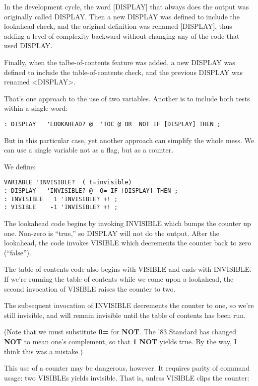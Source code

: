 In the development cycle, the word [DISPLAY] that always does
the output was originally called DISPLAY. Then a new DISPLAY was
defined to include the lookahead check, and the original definition was
renamed [DISPLAY], thus adding a level of complexity backward
without changing any of the code that used DISPLAY.

Finally, when the talbe-of-contents feature was added, a new DISPLAY
was defined to include the table-of-contents check, and the
previous DISPLAY was renamed <DISPLAY>.

That's one approach to the use of two variables. Another is to include
both tests within a single word:

\begin{verbatim}
: DISPLAY   'LOOKAHEAD? @  'TOC @ OR  NOT IF [DISPLAY] THEN ;
\end{verbatim}

But in this particular case, yet another approach can simplify the whole
mess. We can use a single variable not as a flag, but as a counter.

We define:

\begin{verbatim}
VARIABLE 'INVISIBLE?  ( t=invisible)
: DISPLAY   'INVISIBLE? @  O= IF [DISPLAY] THEN ;
: INVISIBLE   1 'INVISIBLE? +! ;
: VISIBLE    -1 'INVISIBLE? +! ;
\end{verbatim}

The lookahead code begins by invoking INVISIBLE which bumps the
counter up one. Non-zero is ``true,'' so DISPLAY will not do the output.
After the lookahead, the code invokes VISIBLE which decrements the
counter back to zero (``false'').

The table-of-contents code also begins with VISIBLE and ends with
INVISIBLE. If we're running the table of contents while we come upon a
lookahead, the second invocation of VISIBLE raises the counter to two.

The subsequent invocation of INVISIBLE decrements the counter to
one, so we're still invisible, and will remain invisible until the table of
contents has been run.

(Note that we must substitute \textbf{0=} for \textbf{NOT}. The '83 Standard has
changed \textbf{NOT} to mean one's complement, so that \textbf{1 NOT} yields true. By
the way, I think this was a mistake.)

This use of a counter may be dangerous, however. It requires parity
of command usage: two VISIBLEs yields invisible. That is, unless VISIBLE
clips the counter:

